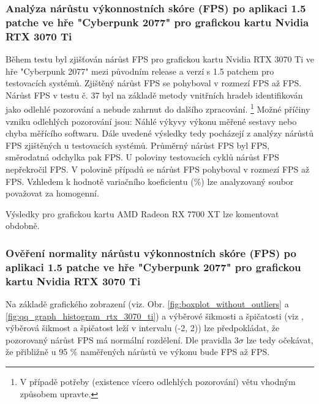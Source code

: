 \newpage
\subsubsection*{Analýza nárůstu výkonnostních skóre (FPS) po aplikaci 1.5 patche ve hře "Cyberpunk 2077" pro grafickou kartu Nvidia RTX 3070 Ti}

Během testu byl zjišťován nárůst FPS pro grafickou kartu Nvidia RTX 3070 Ti ve hře "Cyberpunk 2077" mezi původním release a verzí s 1.5 patchem 
pro  testovacích systémů. Zjištěný nárůst FPS se pohyboval v rozmezí  FPS
až  FPS. Nárůst FPS v testu č. 37 byl na základě metody vnitřních hradeb identifikován jako odlehlé pozorování
a nebude zahrnut do dalšího zpracování. \footnote{V případě potřeby (existence vícero odlehlých pozorování) větu vhodným způsobem upravte.}
Možné příčiny vzniku odlehlých pozorování jsou: Náhlé výkyvy výkonu měřené sestavy nebo chyba měřícího softwaru. Dále uvedené výsledky 
tedy pocházejí z analýzy nárůstů FPS zjištěných u  testovacích systémů. Průměrný nárůst FPS byl  FPS, 
směrodatná odchylka pak  FPS. U poloviny testovacích cyklů nárůst FPS nepřekročil  FPS\@.
V polovině případů se nárůst FPS pohyboval v rozmezí  FPS až  FPS. Vzhledem k hodnotě
variačního koeficientu (\mbox{}\%) lze analyzovaný soubor považovat za homogenní.

\vspace{1em}
\noindent
Výsledky pro grafickou kartu AMD Radeon RX 7700 XT lze komentovat obdobně.

\subsubsection*{Ověření normality nárůstu výkonnostních skóre (FPS) po aplikaci 1.5 patche ve hře "Cyberpunk 2077" pro grafickou kartu Nvidia RTX 3070 Ti}

Na základě grafického zobrazení (viz. Obr. \ref{fig:boxplot_without_outliers} a \ref{fig:qq_graph_histogram_rtx_3070_ti}) a výběrové šikmosti a špičatosti (viz , výběrová šikmost a špičatost leží 
v intervalu (-2, 2)) lze  předpokládat, že pozorovaný nárůst FPS má normální rozdělení. Dle pravidla 3$\sigma$
lze tedy očekávat, že přibližně u 95 \% naměřených nárůstů ve výkonu bude  FPS až  FPS\@.


